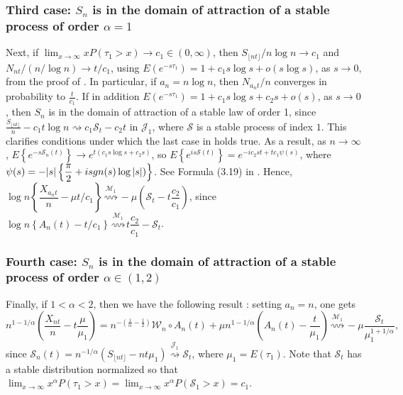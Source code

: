 \documentclass[final]{amsart}
\theoremstyle{definition}
\numberwithin{equation}{section}
\def\disp{\displaystyle}
\newcommand{\cJ}{\ensuremath{\mathcal{J}}}
\newcommand{\cM}{\ensuremath{\mathcal{M}}}
\newcommand{\cS}{\ensuremath{\mathcal{S}}}
\newcommand{\cW}{\ensuremath{\mathcal{W}}}
\def\nt{{\lfloor n t \rfloor}}
\def\nt{{\lfloor n t \rfloor}}
\begin{document}
\subsubsection{Third case: $S_n$ is in the domain of attraction of a stable process of order $\alpha=1$}
Next, if  $\disp \lim_{x\to\infty}xP(\tau_1>x)\to c_1\in (0,\infty)$, then $S_\nt/n\log{n} \to c_1$ and $N_{nt}/\left(n/\log{n}\right)\to t/c_1$, using   $E\left(e^{-s\tau_1}\right) = 1 + c_1 s\log{s} + o(s\log{s})$, as $s\to 0$, from the proof of \cite[Proposition A.1]{Chavez-Casillas/Elliott/Remillard/Swishchuk:2019}.
In particular, if $a_n = n\log{n}$, then $N_{a_n t}/n$ converges in probability to $\frac{t}{c_1}$. If in addition  $E\left(e^{-s\tau_1}\right) = 1 + c_1 s\log{s}+c_2 s + o(s)$, as $s\to 0$, then  $S_n$ is in the domain of attraction of a stable law of order 1, since
$\frac{S_{\lfloor nt \rfloor}}{n}-c_1 t \log{n} \rightsquigarrow c_1 \cS_t - c_2 t $ in $\cJ_1$,
 where $\cS$ is a stable process of index $1$.
 This clarifies conditions under which the last case in  \cite[Section 4.2.2]{Chavez-Casillas/Elliott/Remillard/Swishchuk:2019} holds true.
 As a result, as $n\to\infty$, $E\left\{e^{-s\cS_n(t)}\right\}\to e^{t\left(c_1 s\log{s}+c_2 s\right)}$, so
$\disp
E\left\{e^{is \cS(t)}\right\} = e^{-ic_2 st +tc_1 \psi(s)}$,
where $\psi(s) = -|s|\left\{\dfrac{\pi}{2} +i{\rm sgn}(s)\log{|s|})\right\}$. See Formula (3.19) in \cite{Feller:1971}. Hence,
$\disp
\log{n}\left\{ \dfrac{X_{a_n t}}{n}-\mu t/c_1\right\} \stackrel{\cM_1}{\rightsquigarrow} -\mu\left(\cS_t -  t \dfrac{c_2}{c_1}\right)$,
since $\log{n}\left\{A_n(t) - t/c_1\right\} \stackrel{\cM_1}{\rightsquigarrow} t \dfrac{c_2}{c_1}-\cS_t $.

\subsubsection{Fourth case: $S_n$ is in the domain of attraction of a stable process of order $\alpha\in (1,2)$}
Finally,  if $1<\alpha<2$, then we have the following result \citep[Theorem 7.4.3]{Whitt:2002}: setting $a_n=n$, one gets
$$
n^{1-1/\alpha} \left(\dfrac{X_{nt}}{n} -t   \dfrac{\mu}{\mu_1}\right) = n^{-\left(\frac{1}{\alpha}-\frac{1}{2}\right)}\cW_n\circ A_n(t) + \mu n^{1-1/\alpha}\left(A_n(t)-\frac{t}{\mu_1}\right)\stackrel{\cM_1}{\rightsquigarrow} - \mu \dfrac{\cS_t}{\mu_1^{1+1/\alpha}},
$$
since $\cS_n(t) = n^{-1/\alpha}\left( S_{\lfloor nt\rfloor} - n t \mu_1\right)\stackrel{\cJ_1}{\rightsquigarrow} \cS_t$, where $\mu_1 = E(\tau_1)$. Note that $\cS_t$ has a stable distribution normalized so that
$\disp \lim_{x\to\infty} x^\alpha P(\tau_1> x) = \lim_{x\to\infty} x^\alpha P(\cS_1> x)= c_1$.
\end{document}
